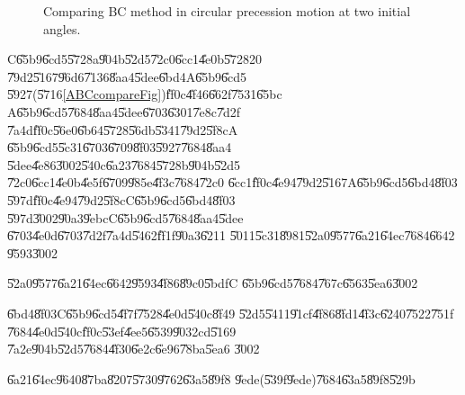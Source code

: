 \begin{figure}[th]
\caption{Comparing BC method in circular precession motion at two initial
angles.}
\label{BC_d_5590}
\begin{center}

\end{center}
\end{figure}

C\U{65b9}\U{6cd5}\U{5728}a\U{904b}\U{52d5}\U{72c0}\U{6cc1}\U{4e0b}\U{5728}20%
\U{79d2}\U{5167}\U{96d6}\U{7136}\U{8aa4}\U{5dee}\U{6bd4}A\U{65b9}\U{6cd5}%
\U{5927}(\U{5716}\ref{ABCcompareFig})\U{ff0c}\U{4f46}\U{662f}\U{7531}\U{65bc}%
A\U{65b9}\U{6cd5}\U{7684}\U{8aa4}\U{5dee}\U{6703}\U{6301}\U{7e8c}\U{7d2f}%
\U{7a4d}\U{ff0c}\U{56e0}\U{6b64}\U{5728}\U{56db}\U{5341}\U{79d2}\U{5f8c}A%
\U{65b9}\U{6cd5}\U{5c31}\U{6703}\U{6709}\U{8f03}\U{5927}\U{7684}\U{8aa4}%
\U{5dee}\U{4e86}\U{3002}\U{540c}\U{6a23}\U{7684}\U{5728}b\U{904b}\U{52d5}%
\U{72c0}\U{6cc1}\U{4e0b}\U{4e5f}\U{6709}\U{985e}\U{4f3c}\U{7684}\U{72c0}%
\U{6cc1}\U{ff0c}\U{4e94}\U{79d2}\U{5167}A\U{65b9}\U{6cd5}\U{6bd4}\U{8f03}%
\U{597d}\U{ff0c}\U{4e94}\U{79d2}\U{5f8c}C\U{65b9}\U{6cd5}\U{6bd4}\U{8f03}%
\U{597d}\U{3002}\U{90a3}\U{9ebc}C\U{65b9}\U{6cd5}\U{7684}\U{8aa4}\U{5dee}%
\U{6703}\U{4e0d}\U{6703}\U{7d2f}\U{7a4d}\U{5462}\U{ff1f}\U{90a3}\U{6211}%
\U{5011}\U{5c31}\U{8981}\U{52a0}\U{9577}\U{6a21}\U{64ec}\U{7684}\U{6642}%
\U{9593}\U{3002}

\begin{case}
\U{52a0}\U{9577}\U{6a21}\U{64ec}\U{6642}\U{9593}\U{4f86}\U{89c0}\U{5bdf}C%
\U{65b9}\U{6cd5}\U{7684}\U{767c}\U{6563}\U{5ea6}\U{3002}
\end{case}

\begin{case}
\U{6bd4}\U{8f03}C\U{65b9}\U{6cd5}\U{4f7f}\U{7528}\U{4e0d}\U{540c}\U{8f49}%
\U{52d5}\U{5411}\U{91cf}\U{4f86}\U{8fd1}\U{4f3c}\U{6240}\U{7522}\U{751f}%
\U{7684}\U{4e0d}\U{540c}\U{ff0c}\U{53ef}\U{4ee5}\U{6539}\U{9032}cd\U{5169}%
\U{7a2e}\U{904b}\U{52d5}\U{7684}\U{4f30}\U{6e2c}\U{6e96}\U{78ba}\U{5ea6}%
\U{3002}
\end{case}

\clearpage%

\begin{case}
\U{6a21}\U{64ec}\U{9640}\U{87ba}\U{8207}\U{5730}\U{9762}\U{63a5}\U{89f8}%
\U{9ede}(\U{539f}\U{9ede})\U{7684}\U{63a5}\U{89f8}\U{529b}
\end{case}

